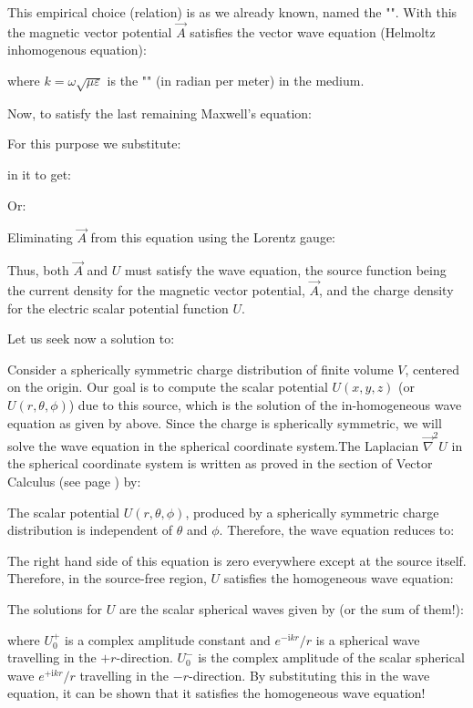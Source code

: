 	This empirical choice (relation) is as we already known, named the "". With this the magnetic vector potential $\vec{A}$ satisfies the vector wave equation (Helmoltz inhomogenous equation):
	
	where $k=\omega\sqrt{\mu\varepsilon}$ is the "" (in radian per meter) in the medium.
	
	Now, to satisfy the last remaining Maxwell's equation:
	
	For this purpose we substitute:
	
	in it to get:
	
	Or:
	
	Eliminating $\vec{A}$ from this equation using the Lorentz gauge:
	
	Thus, both $\vec{A}$ and $U$ must satisfy the wave equation, the source function being the current density for the magnetic vector potential, $\vec{A}$, and the charge density for the electric scalar potential function $U$.
	
	Let us seek now a solution to:
	
	Consider a spherically symmetric charge distribution of finite volume $V$, centered on the origin. Our goal is to compute the scalar potential $U(x, y, z)$ (or $U(r, \theta, \phi)$) due to this source, which is the solution of the in-homogeneous wave equation as given by above. Since the charge is spherically symmetric, we will solve the wave equation in the spherical coordinate system.The Laplacian $\vec{\nabla}^2 U$ in the spherical coordinate system is written as proved in the section of Vector Calculus (see page \pageref{scalar laplacian}) by:
	
	The scalar potential $U(r, \theta, \phi)$, produced by a spherically symmetric charge distribution  is  independent of $\theta$ and $\phi$.  Therefore,  the  wave  equation reduces to:
	
	The right hand side of this equation is zero everywhere except at the source itself. Therefore, in the source-free region, $U$ satisfies the homogeneous wave equation:
	
	The solutions for $U$ are the scalar spherical waves given by (or the sum of them!):
	
	where $U_0^{+}$ is a complex amplitude constant and ${e^{-\mathrm{i}kr}}/{r}$ is a spherical wave travelling in the $+r$-direction. $U_0^{-}$ is the complex amplitude of the scalar spherical wave  ${e^{+\mathrm{i}kr}}/{r}$ travelling in the $-r$-direction. By substituting this in the wave equation, it can be shown that it satisfies the homogeneous wave equation!
	
